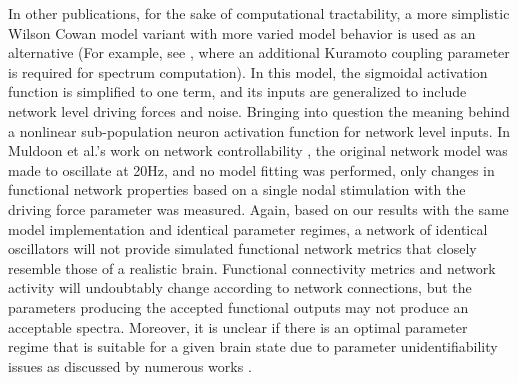 In other publications, for the sake of computational tractability, a more simplistic Wilson Cowan model variant with more varied model behavior is used as an alternative (For example, see \cite{Deco2009}, where an additional Kuramoto coupling parameter is required for spectrum computation). In this model, the sigmoidal activation function is simplified to one term, and its inputs are generalized to include network level driving forces and noise. Bringing into question the meaning behind a nonlinear sub-population neuron activation function for network level inputs. In Muldoon et al.'s work on network controllability \cite{muldoon_stimulation-based_2016}, the original network model was made to oscillate at 20Hz, and no model fitting was performed, only changes in functional network properties based on a single nodal stimulation with the driving force parameter was measured. Again, based on our results with the same model implementation and identical parameter regimes, a network of identical oscillators will not provide simulated functional network metrics that closely resemble those of a realistic brain. Functional connectivity metrics and network activity will undoubtably change according to network connections, but the parameters producing the accepted functional outputs may not produce an acceptable spectra. Moreover, it is unclear if there is an optimal parameter regime that is suitable for a given brain state due to parameter unidentifiability issues as discussed by numerous works \cite{hartoyo_parameter_2019, chis_relationship_2016, villaverde_observability_2019}.

